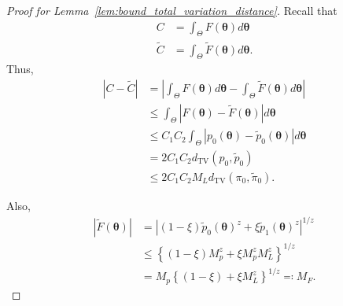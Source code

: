\documentclass[12pt]{article}
\begin{document}
\begin{proof}[Proof for Lemma~\ref{lem:bound_total_variation_distance}]
    Recall that
    \begin{align*}
        C &= \int_\Theta F(\bm{\theta}) d\bm{\theta} \\
        \tilde{C} &= \int_\Theta \tilde{F}(\bm{\theta}) d\bm{\theta}.
    \end{align*}
    Thus,
    \begin{align}
        |C - \tilde{C}| &= \left| \int_\Theta F(\bm{\theta}) d\bm{\theta} - \int_\Theta \tilde{F}(\bm{\theta})d\bm{\theta} \right| \nonumber \\
        &\leq \int_\Theta \left|F(\bm{\theta}) - \tilde{F}(\bm{\theta})\right| d\bm{\theta} \nonumber \\
        &\leq C_1 C_2 \int_\Theta |p_0(\bm{\theta}) - \tilde{p}_0(\bm{\theta})| d\bm{\theta} \nonumber \\
        &= 2 C_1 C_2 d_{\mathrm{TV}}(p_0, \tilde{p}_0) \nonumber \\
        &\leq 2 C_1 C_2 M_L d_{\mathrm{TV}}(\pi_0, \tilde{\pi}_0). \label{eq:bound_for_c_c_tilde}
    \end{align}

    Also,
    \begin{align}
        |\tilde{F}(\bm{\theta})| &= \left|(1 - \xi) \tilde{p}_0(\bm{\theta})^z + \xi \tilde{p}_1(\bm{\theta})^z\right|^{1/z} \nonumber \\
        &\leq \left\{(1 - \xi)M_p^z + \xi M_p^z M_L^z\right\}^{1/z} \nonumber \\
        &= M_p\left\{(1 - \xi) + \xi M_L^z\right\}^{1/z} \eqqcolon M_F. \label{eq:bound_for_f_tilde}
    \end{align}


\end{proof}
\end{document}
